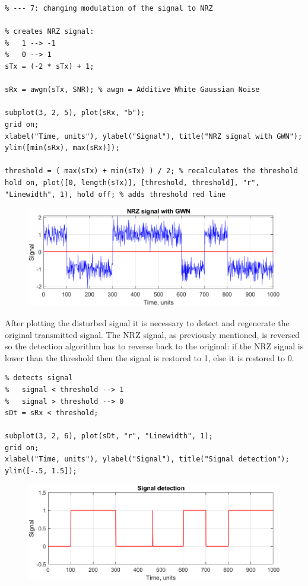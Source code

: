 \begin{lstlisting}
% --- 7: changing modulation of the signal to NRZ

% creates NRZ signal:
%   1 --> -1 
%   0 --> 1
sTx = (-2 * sTx) + 1; 

sRx = awgn(sTx, SNR); % awgn = Additive White Gaussian Noise

subplot(3, 2, 5), plot(sRx, "b");
grid on;
xlabel("Time, units"), ylabel("Signal"), title("NRZ signal with GWN");
ylim([min(sRx), max(sRx)]);

threshold = ( max(sTx) + min(sTx) ) / 2; % recalculates the threshold 
hold on, plot([0, length(sTx)], [threshold, threshold], "r", "Linewidth", 1), hold off; % adds threshold red line
\end{lstlisting}

\begin{figure}[h!]
    \centering
    \includegraphics[width = .8\textwidth]{lab-1/imgs/NRZ_SNR10.png}
\end{figure}

\noindent After plotting the disturbed signal it is necessary to detect and regenerate the original transmitted signal. The NRZ signal, as previously mentioned, is reversed so the detection algorithm has to reverse back to the original: if the NRZ signal is lower than the threshold then the signal is restored to 1, else it is restored to 0.

\begin{lstlisting}
% detects signal
%   signal < threshold --> 1
%   signal > threshold --> 0
sDt = sRx < threshold;

subplot(3, 2, 6), plot(sDt, "r", "Linewidth", 1);
grid on;
xlabel("Time, units"), ylabel("Signal"), title("Signal detection");
ylim([-.5, 1.5]);
\end{lstlisting}

\begin{figure}[h!]
    \centering
    \includegraphics[width = .8\textwidth]{lab-1/imgs/NRZ_detection_SNR10_1.png}
\end{figure}

